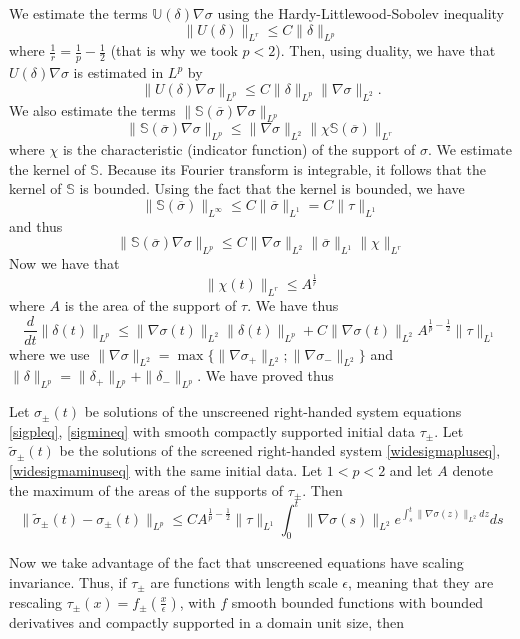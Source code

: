 \documentclass[11pt,reqno]{amsproc}
\newcommand{\la}{\label}
\newcommand{\fr}{\frac}
\newcommand{\na}{\nabla}
\newcommand{\be}{\begin{equation}}
\newcommand{\ee}{\end{equation}}
\newcommand{\beg}{\begin}
\newcommand{\ov}{\overline}
\begin{document}
We estimate the terms $\mathbb U(\delta)\na\sigma$ using the Hardy-Littlewood-Sobolev inequality
\be
\|U(\delta)\|_{L^r} \le C\|\delta\|_{L^p}
\la{hls}
\ee
where $\fr{1}{r} = \fr{1}{p}- \fr{1}{2}$ (that is why we took $p<2$). Then, using duality, we have
that $U(\delta)\na\sigma$ is estimated in $L^p$ by 
\be
\|U(\delta)\na\sigma\|_{L^p} \le C\|\delta\|_{L^p}\|\na\sigma\|_{L^2}.
\la{goodb}
\ee
We also estimate the terms $\|\mathbb S(\ov\sigma)\na\sigma\|_{L^p}$
\be
\|\mathbb S(\ov\sigma)\na\sigma\|_{L^p}\le \|\na\sigma\|_{L^2} \|\chi\mathbb S(\ov\sigma)\|_{L^r}
\la{forcetermlp}
\ee
where $\chi$ is the characteristic (indicator function) of the support of $\sigma$.
We estimate the kernel of $\mathbb S$. Because its Fourier transform is integrable, it follows that the kernel of $\mathbb S$ is bounded.  
Using the fact that the kernel is bounded, we have
\be
\|\mathbb S(\ov\sigma)\|_{L^{\infty}}\le C\|\ov\sigma\|_{L^1} = C\|\tau\|_{L^1}
\la{sovsiglifty}
\ee
and thus
\be
\|\mathbb S(\ov\sigma)\na\sigma\|_{L^p} \le C\|\na\sigma\|_{L^2}\|\ov\sigma\|_{L^1}\|\chi\|_{L^r}
\la{boundf}
\ee
Now  we have that 
\be
\|\chi(t)\|_{L^r} \le  A^{\fr{1}{r}}
\la{chitr}
\ee
where $A$ is the area of the support of $\tau$.
We have thus
\be
\fr{d}{dt}\|\delta(t)\|_{L^p} \le \|\na \sigma(t)\|_{L^2}\|\delta(t)\|_{L^p} + C\|\na\sigma(t)\|_{L^2}A^{\fr{1}{p}-\fr{1}{2}}\|\tau\|_{L^1}
\la{deltalpev}
\ee
where we use  $\|\na\sigma\|_{L^2} = \max \{\|\na\sigma_{+}\|_{L^2};  \|\na\sigma_{-}\|_{L^2}\}$ and
$\|\delta\|_{L^p} = \|\delta_+\|_{L^p} + \|\delta_-\|_{L^p}$.
We have proved thus
\beg{prop}\la{stab}
Let $\sigma_\pm(t)$ be solutions of the unscreened right-handed system equations \eqref{sigpleq}, \eqref{sigmineq} with smooth compactly supported initial data $\tau_{\pm}$. Let $\widetilde\sigma_{\pm}(t)$
be the solutions of the screened right-handed system \eqref{widesigmapluseq}, \eqref{widesigmaminuseq} with the same initial data. Let $1<p<2$ and let $A$ denote the maximum of the areas of the supports of
$\tau_{\pm}$. 
Then 
\be
\|\widetilde\sigma_{\pm}(t)-\sigma_{\pm}(t)\|_{L^p} \le CA^{\fr{1}{p}-\fr{1}{2}}\|\tau\|_{L^1}
\int_0^t\|\na \sigma (s)\|_{L^2}e^{\int_s^t\|\na\sigma(z)\|_{L^2}dz}ds
\la{lpboundiff}
\ee
\end{prop}
Now we take advantage of the fact that unscreened equations have scaling invariance. Thus, if $\tau_{\pm}$  are functions with length scale $\epsilon$, meaning that they are rescaling $\tau_{\pm}(x) = f_{\pm}\left(\fr{x}{\epsilon}\right)$, with $f$ smooth bounded functions with bounded derivatives and compactly supported in a domain unit size, then 
\end{document}
